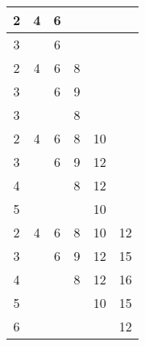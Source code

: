 \documentclass[12pt,ngerman]{article}
\def\DG#1{\textcolor{cdarkgreen}{#1}}
\theoremstyle{definition}
\begin{document}
\begin{table}[h]
{\begin{tabular}{|c|c|c|c|c|c|}
\hline
\hline
2	& 4 & \DG{6} & 	& 	&	\\
\hline
3	& 	& \DG{6} & 	& 	&	\\
\hline
\hline
2	& 4 & 6 & \DG{8} & 	&	\\
\hline
3	& 	& 6 & \DG{9} &	&	\\
\hline
3	&	&	& \DG{8} &	&	\\
\hline
\hline
2	& 4 & 6 & 8 & \DG{10}&	\\
\hline
3	&	& 6 & 9 & \DG{12}&	\\
\hline
4	&	&	& 8 & \DG{12}&	\\
\hline
5	&	&	&	& \DG{10}&	\\
\hline
\hline
2	& 4 & 6 & 8 & 10& \DG{12}\\
\hline
3	&	& 6 & 9 & 12& \DG{15}\\
\hline
4 	&	&	& 8 & 12& \DG{16}\\
\hline
5	&	&	&	& 10& \DG{15}\\
\hline
6	&	&	&	&	& \DG{12}\\
\hline
\end{tabular}
}
\end{table}
\end{document}
